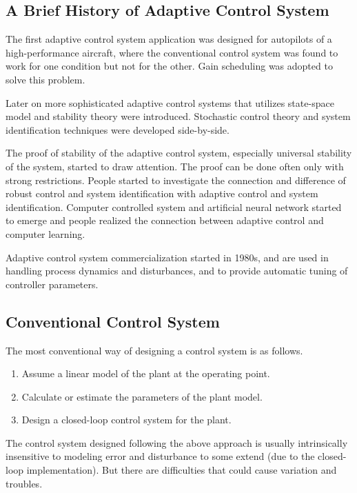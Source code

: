 \subsection{A Brief History of Adaptive Control System}

The first adaptive control system application was designed for autopilots of a high-performance aircraft, where the conventional control system was found to work for one condition but not for the other. Gain scheduling was adopted to solve this problem.

Later on more sophisticated adaptive control systems that utilizes state-space model and stability theory were introduced. Stochastic control theory and system identification techniques were developed side-by-side.

The proof of stability of the adaptive control system, especially universal stability of the system, started to draw attention. The proof can be done often only with strong restrictions. People started to investigate the connection and difference of robust control and system identification with adaptive control and system identification. Computer controlled system and artificial neural network started to emerge and people realized the connection between adaptive control and computer learning.

Adaptive control system commercialization started in 1980s, and are used in handling process dynamics and disturbances, and to provide automatic tuning of controller parameters.

\subsection{Conventional Control System}

The most conventional way of designing a control system is as follows.

\begin{enumerate}
	\item Assume a linear model of the plant at the operating point.
	\item Calculate or estimate the parameters of the plant model.
	\item Design a closed-loop control system for the plant.
\end{enumerate}

The control system designed following the above approach is usually intrinsically insensitive to modeling error and disturbance to some extend (due to the closed-loop implementation). But there are difficulties that could cause variation and troubles.

